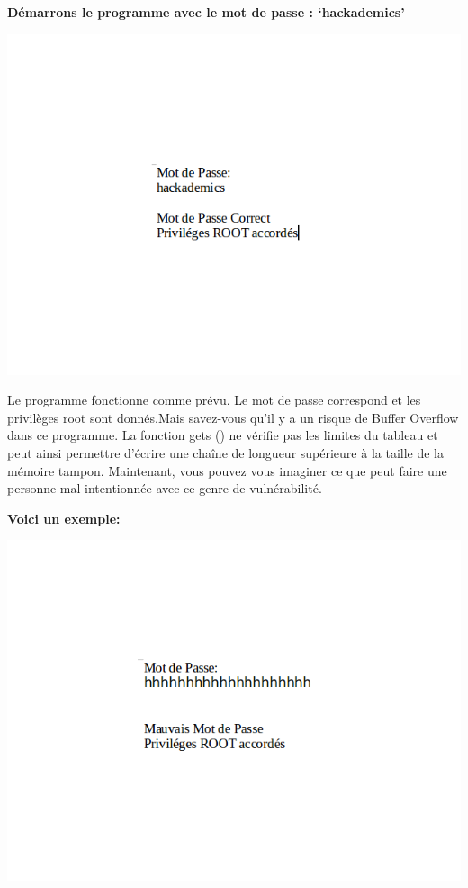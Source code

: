 \begin{flushleft}
\textbf{Démarrons le programme avec le mot de passe : ‘hackademics'}
\end{flushleft}

\begin{center}
\includegraphics[scale=0.5]{Application/assets/bmdp.png}
\end{center}

\begin{flushleft}
Le programme fonctionne comme prévu. Le mot de passe correspond et les privilèges root sont donnés.Mais savez-vous qu'il y a un risque de Buffer Overflow dans ce programme. La fonction gets () ne vérifie pas les limites du tableau et peut ainsi permettre d'écrire une chaîne de longueur supérieure à la taille de la mémoire tampon. Maintenant, vous pouvez vous imaginer ce que peut faire une personne mal intentionnée avec ce genre de vulnérabilité.
\end{flushleft}


\begin{flushleft}
\textbf{Voici un exemple:}
\end{flushleft}

\begin{center}
\includegraphics[scale=0.5]{Application/assets/mmdp.png}
\end{center}

